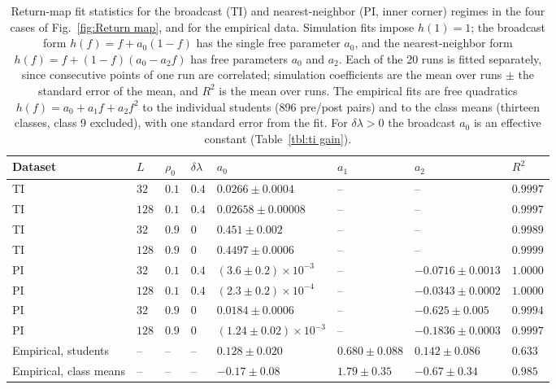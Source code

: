 \documentclass[a4paper,fleqn]{cas-sc}
\begin{document}
    \begin{table}[htbp]
    \caption{Return-map fit statistics for the broadcast (TI) and nearest-neighbor (PI, inner corner) regimes in the four cases of Fig.~\ref{fig:Return map}, and for the empirical data.
    Simulation fits impose $h(1)=1$; the broadcast form $h(f)=f+a_0(1-f)$ has the single free parameter $a_0$, and the nearest-neighbor form $h(f)=f+(1-f)(a_0-a_2 f)$ has free parameters $a_0$ and $a_2$.
    Each of the 20 runs is fitted separately, since consecutive points of one run are correlated; simulation coefficients are the mean over runs $\pm$ the standard error of the mean, and $R^2$ is the mean over runs.
    The empirical fits are free quadratics $h(f)=a_0+a_1 f+a_2 f^2$ to the individual students (896 pre/post pairs) and to the class means (thirteen classes, class 9 excluded), with one standard error from the fit. For $\delta\lambda>0$ the broadcast $a_0$ is an effective constant (Table~\ref{tbl:ti gain}).}
    \label{tbl:returnmapfits}
    \begin{tabular*}{\tblwidth}{@{}LLLLLLLL@{}}
    \toprule
    Dataset & $L$ & $\rho_0$ & $\delta\lambda$ & $a_0$ & $a_1$ & $a_2$ & $R^2$ \\
    \midrule
    TI & $32$ & $0.1$ & $0.4$ & $0.0266\pm0.0004$ & -- & -- & $0.9997$ \\
    TI & $128$ & $0.1$ & $0.4$ & $0.02658\pm0.00008$ & -- & -- & $0.9997$ \\
    TI & $32$ & $0.9$ & $0$ & $0.451\pm0.002$ & -- & -- & $0.9989$ \\
    TI & $128$ & $0.9$ & $0$ & $0.4497\pm0.0006$ & -- & -- & $0.9999$ \\
    PI & $32$ & $0.1$ & $0.4$ & $(3.6\pm0.2)\times10^{-3}$ & -- & $-0.0716\pm0.0013$ & $1.0000$ \\
    PI & $128$ & $0.1$ & $0.4$ & $(2.3\pm0.2)\times10^{-4}$ & -- & $-0.0343\pm0.0002$ & $1.0000$ \\
    PI & $32$ & $0.9$ & $0$ & $0.0184\pm0.0006$ & -- & $-0.625\pm0.005$ & $0.9994$ \\
    PI & $128$ & $0.9$ & $0$ & $(1.24\pm0.02)\times10^{-3}$ & -- & $-0.1836\pm0.0003$ & $0.9997$ \\
    \midrule
    Empirical, students & -- & -- & -- & $0.128\pm0.020$ & $0.680\pm0.088$ & $0.142\pm0.086$ & $0.633$ \\
    Empirical, class means & -- & -- & -- & $-0.17\pm0.08$ & $1.79\pm0.35$ & $-0.67\pm0.34$ & $0.985$ \\
    \bottomrule
    \end{tabular*}
    \end{table}
\end{document}
